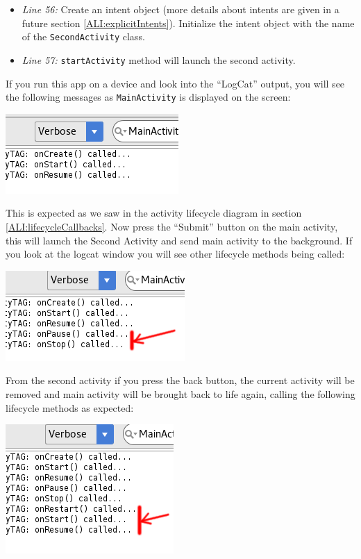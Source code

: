 \begin{itemize}
	\item \textit{Line 56:} Create an intent object (more details about intents are given in a future section \ref{ALI:explicitIntents}). Initialize the intent object with the name of the \texttt{SecondActivity} class.
	
	\item \textit{Line 57:} \texttt{startActivity} method will launch the second activity.
\end{itemize}

If you run this app on a device and look into the ``LogCat'' output, you will see the following messages as \texttt{MainActivity} is displayed on the screen:

\begin{center}
	\includegraphics[scale=0.4]{chapters/ch08/images/9}
\end{center}

This is expected as we saw in the activity lifecycle diagram in section \ref{ALI:lifecycleCallbacks}. Now press the ``Submit'' button on the main activity, this will launch the Second Activity and send main activity to the background. If you look at the logcat window you will see other lifecycle methods being called:

\begin{center}
	\includegraphics[scale=0.4]{chapters/ch08/images/10}
\end{center}

From the second activity if you press the back button, the current activity will be removed and main activity will be brought back to life again, calling the following lifecycle methods as expected:

\begin{center}
	\includegraphics[scale=0.4]{chapters/ch08/images/11}
\end{center}

